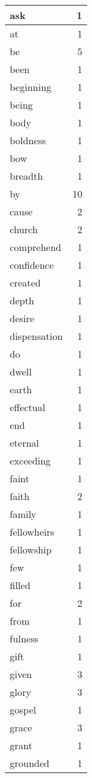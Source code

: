 \begin{center}
\begin{longtable}{l|r}
ask & 1\\ \hline 
at & 1\\ \hline 
be & 5\\ \hline 
been & 1\\ \hline 
beginning & 1\\ \hline 
being & 1\\ \hline 
body & 1\\ \hline 
boldness & 1\\ \hline 
bow & 1\\ \hline 
breadth & 1\\ \hline 
by & 10\\ \hline 
cause & 2\\ \hline 
church & 2\\ \hline 
comprehend & 1\\ \hline 
confidence & 1\\ \hline 
created & 1\\ \hline 
depth & 1\\ \hline 
desire & 1\\ \hline 
dispensation & 1\\ \hline 
do & 1\\ \hline 
dwell & 1\\ \hline 
earth & 1\\ \hline 
effectual & 1\\ \hline 
end & 1\\ \hline 
eternal & 1\\ \hline 
exceeding & 1\\ \hline 
faint & 1\\ \hline 
faith & 2\\ \hline 
family & 1\\ \hline 
fellowheirs & 1\\ \hline 
fellowship & 1\\ \hline 
few & 1\\ \hline 
filled & 1\\ \hline 
for & 2\\ \hline 
from & 1\\ \hline 
fulness & 1\\ \hline 
gift & 1\\ \hline 
given & 3\\ \hline 
glory & 3\\ \hline 
gospel & 1\\ \hline 
grace & 3\\ \hline 
grant & 1\\ \hline 
grounded & 1\\ \hline 

\end{longtable}
\end{center}
